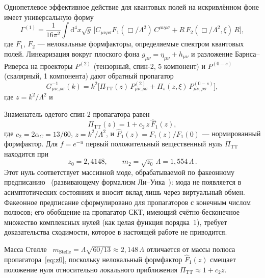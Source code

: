 \documentclass[12pt,a4paper]{article}
\theoremstyle{plain}
\theoremstyle{definition}
\theoremstyle{remark}
\newcommand{\dd}{\mathrm{d}}
\begin{document}
Однопетлевое эффективное действие для квантовых полей на искривлённом
фоне имеет универсальную форму~\cite{BV:1987,BV:1990}
\begin{equation}\label{eq:Gamma1}
  \Gamma^{(1)} = \frac{1}{16\pi^2}\int \dd^4 x\sqrt{g}\,\bigl[
  C_{\mu\nu\rho\sigma} F_1(\Box/\Lambda^2)\, C^{\mu\nu\rho\sigma}
  + R\, F_2(\Box/\Lambda^2, \xi)\, R \bigr],
\end{equation}
где $F_1$, $F_2$ --- нелокальные формфакторы, определяемые спектром
квантовых полей. Линеаризация вокруг плоского фона
$g_{\mu\nu} = \eta_{\mu\nu} + h_{\mu\nu}$ и разложение Барнса--Риверса
на проекторы $P^{(2)}$ (тензорный, спин-2, 5 компонент) и $P^{(0-s)}$
(скалярный, 1 компонента) дают обратный пропагатор~\cite{BV:1987}
\begin{equation}\label{eq:inv-prop}
  G^{-1}_{\mu\nu,\rho\sigma}(k) = k^2\bigl[
  \Pi_{\mathrm{TT}}(z)\, P^{(2)}_{\mu\nu,\rho\sigma}
  + \Pi_s(z, \xi)\, P^{(0-s)}_{\mu\nu,\rho\sigma}\bigr],
\end{equation}
где $z = k^2/\Lambda^2$ и

Знаменатель одетого спин-2 пропагатора
равен~\cite{BV:1987,Alfyorov:2026paper1}
\begin{equation}\label{eq:PiTT}
  \Pi_{\mathrm{TT}}(z) = 1 + c_2\, z\, \hat{F}_1(z),
\end{equation}
где $c_2 = 2\alpha_C = 13/60$, $z = k^2/\Lambda^2$, и
$\hat{F}_1(z) = F_1(z)/F_1(0)$ --- нормированный формфактор.
Для $f = e^{-u}$ первый положительный вещественный нуль
$\Pi_{\mathrm{TT}}$ находится при
\begin{equation}\label{eq:z0}
  z_0 = 2{,}4148,\qquad
  m_2 = \sqrt{z_0}\,\Lambda = 1{,}554\,\Lambda\,.
\end{equation}
Этот нуль соответствует массивной моде, обрабатываемой по
факеонному предписанию~\cite{Anselmi:2017,Anselmi:2018}
(развивающему формализм Ли--Уика~\cite{LeeWick:1969}): мода
не появляется в асимптотических состояниях и вносит вклад лишь
через виртуальный обмен. Факеонное предписание сформулировано для
пропагаторов с конечным числом полюсов; его обобщение на
пропагатор СКТ, имеющий счётно-бесконечное множество комплексных
нулей (как целая функция порядка~1), требует доказательства
сходимости, которое в настоящей работе не приводится.

Масса Стелле~\cite{Stelle:1977}
$m_{\mathrm{Stelle}} = \Lambda\sqrt{60/13} \approx 2{,}148\,\Lambda$
отличается от массы полюса пропагатора~\eqref{eq:z0}, поскольку
нелокальный формфактор $\hat{F}_1(z)$ смещает положение нуля
относительно локального приближения
$\Pi_{\mathrm{TT}} \approx 1 + c_2 z$.
\end{document}
